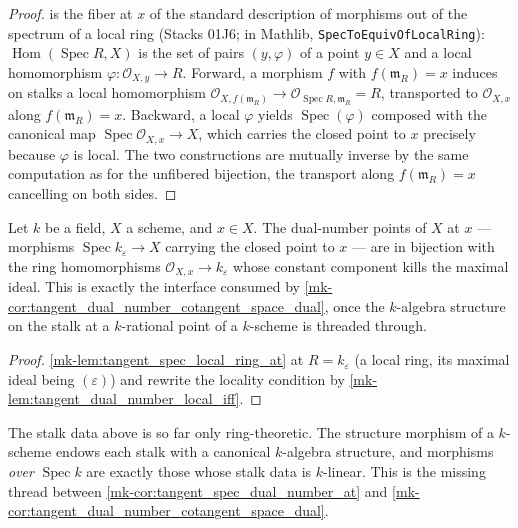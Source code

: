 \begin{proof}
  \leanokThis is the fiber at \(x\) of the standard description of morphisms
  out of the spectrum of a local ring (Stacks 01J6; in Mathlib,
  \texttt{SpecToEquivOfLocalRing}):
  \(\operatorname{Hom}(\operatorname{Spec} R, X)\) is the set of pairs
  \((y, \varphi)\) of a point \(y \in X\) and a local homomorphism
  \(\varphi : \mathcal O_{X,y} \to R\). Forward, a morphism \(f\) with
  \(f(\mathfrak m_R) = x\) induces on stalks a local homomorphism
  \(\mathcal O_{X,f(\mathfrak m_R)} \to \mathcal O_{\operatorname{Spec} R,\mathfrak m_R}
    = R\), transported to \(\mathcal O_{X,x}\) along
  \(f(\mathfrak m_R) = x\). Backward, a local \(\varphi\) yields
  \(\operatorname{Spec}(\varphi)\) composed with the canonical map
  \(\operatorname{Spec} \mathcal O_{X,x} \to X\), which carries the
  closed point to \(x\) precisely because \(\varphi\) is local. The
  two constructions are mutually inverse by the same computation as
  for the unfibered bijection, the transport along \(f(\mathfrak m_R) = x\)
  cancelling on both sides.
\end{proof}

\begin{corollary}\label{mk-cor:tangent_spec_dual_number_at}
  \leanok

  Let \(k\) be a field, \(X\) a scheme, and \(x \in X\). The
  dual-number points of \(X\) at \(x\) — morphisms
  \(\operatorname{Spec} k_\varepsilon \to X\) carrying the closed point
  to \(x\) — are in bijection with the ring homomorphisms
  \(\mathcal O_{X,x} \to k_\varepsilon\) whose constant component kills
  the maximal ideal. This is exactly the interface consumed by
  \ref{mk-cor:tangent_dual_number_cotangent_space_dual}, once the
  \(k\)-algebra structure on the stalk at a \(k\)-rational point of a
  \(k\)-scheme is threaded through.
\end{corollary}

\begin{proof}
  \leanokInstantiate \ref{mk-lem:tangent_spec_local_ring_at} at
  \(R = k_\varepsilon\) (a local ring, its maximal ideal being
  \((\varepsilon)\)) and rewrite the locality condition by
  \ref{mk-lem:tangent_dual_number_local_iff}.
\end{proof}

The stalk data above is so far only ring-theoretic. The structure
morphism of a \(k\)-scheme endows each stalk with a canonical
\(k\)-algebra structure, and morphisms \emph{over} \(\operatorname{Spec} k\)
are exactly those whose stalk data is \(k\)-linear. This is the missing
thread between \ref{mk-cor:tangent_spec_dual_number_at} and
\ref{mk-cor:tangent_dual_number_cotangent_space_dual}.

